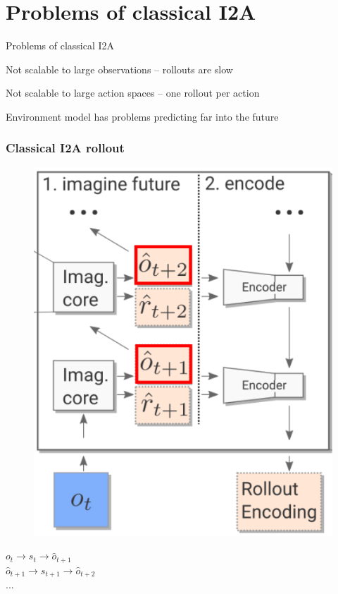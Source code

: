 
\section{Problems of classical I2A}
\begin{frame}{Problems of classical I2A}
    \begin{PraesentationAufzaehlung}
        \item Not scalable to large observations -- rollouts are slow
        \item Not scalable to large action spaces -- one rollout per action
        \item Environment model has problems predicting far into the future
    \end{PraesentationAufzaehlung}
\end{frame}

\begin{frame}
	\frametitle{Classical I2A rollout}
	\vspace{-10mm}
	\begin{multicols}{2}
	\begin{figure}[h]
		\centering
		\includegraphics[height=0.65\textheight]{./latent_i2a_images/SingleImaginationRollout_marked.png}
	\end{figure}
	\columnbreak
	\centering
	$o_t \rightarrow s_t \rightarrow \hat{o}_{t+1}$\\
	$\hat{o}_{t+1} \rightarrow s_{t+1} \rightarrow \hat{o}_{t+2}$\\
	...
	\end{multicols}
\end{frame}

